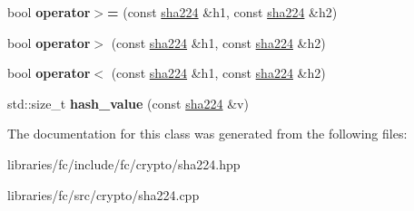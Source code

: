 \begin{DoxyCompactItemize}
bool {\bfseries operator$>$=} (const \mbox{\hyperlink{classfc_1_1sha224}{sha224}} \&h1, const \mbox{\hyperlink{classfc_1_1sha224}{sha224}} \&h2)
\item 
\mbox{\label{classfc_1_1sha224_a0685326aba8fe1bd639a0ccda85e2fa3}} 
bool {\bfseries operator$>$} (const \mbox{\hyperlink{classfc_1_1sha224}{sha224}} \&h1, const \mbox{\hyperlink{classfc_1_1sha224}{sha224}} \&h2)
\item 
\mbox{\label{classfc_1_1sha224_a3b446130a7ac6778ad07a6c3fd3c9e99}} 
bool {\bfseries operator$<$} (const \mbox{\hyperlink{classfc_1_1sha224}{sha224}} \&h1, const \mbox{\hyperlink{classfc_1_1sha224}{sha224}} \&h2)
\item 
\mbox{\label{classfc_1_1sha224_aa1a301b325d4b04f403759119ffb7cd3}} 
std\+::size\+\_\+t {\bfseries hash\+\_\+value} (const \mbox{\hyperlink{classfc_1_1sha224}{sha224}} \&v)
\end{DoxyCompactItemize}


The documentation for this class was generated from the following files\+:\begin{DoxyCompactItemize}
\item 
libraries/fc/include/fc/crypto/sha224.\+hpp\item 
libraries/fc/src/crypto/sha224.\+cpp\end{DoxyCompactItemize}
